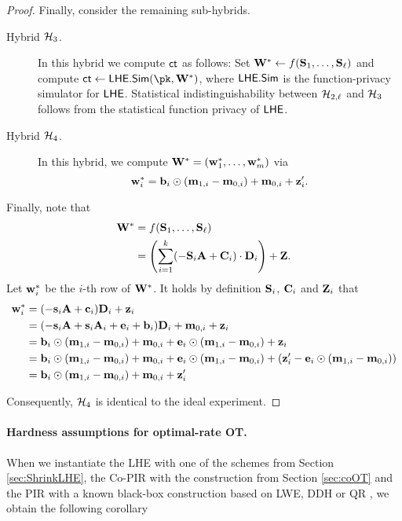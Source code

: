 \begin{proof}
Finally, consider the remaining sub-hybrids.

\begin{description}
\item[Hybrid $\mathcal{H}_3$.] In this hybrid we compute $\mathsf{ct}$ as follows: Set $\mathbf{W}^\ast \gets f(\mathbf{S}_1,\dots,\mathbf{S}_\ell)$ and compute $\ct \gets \LHE.\Sim(\pk,\vc{W}^\ast)$, where $\mathsf{LHE}.\mathsf{Sim}$ is the function-privacy simulator for $\mathsf{LHE}$. Statistical indistinguishability between $\mathcal{H}_{2,\ell}$ and $\mathcal{H}_3$ follows from the statistical function privacy of $\mathsf{LHE}$.

\item[Hybrid $\mathcal{H}_4$.] In this hybrid, we compute $\mathbf{W}^\ast=(\mathbf{w}^\ast_1,\dots, \mathbf{w}^\ast_m)$ via $$\mathbf{w}^\ast_i=\mathbf{b}_i\odot (\mathbf{m}_{1,i}-\mathbf{m}_{0,i})+\mathbf{m}_{0,i}+\mathbf{z}_i'.$$
\end{description}

Finally, note that
\begin{align*}
\mathbf{W}^\ast &= f(\mathbf{S}_1,\dots,\mathbf{S}_\ell)\\
&= \left( \sum_{i = 1}^k (-\mathbf{S}_i\mathbf{A} + \mathbf{C}_i)\cdot \mathbf{D}_i \right) + \mathbf{Z}.
\end{align*}
Let $\mathbf{w}^\ast_i$ be the $i$-th row of $\mathbf{W}^\ast$. It holds by definition $\mathbf{S}_i$, $\mathbf{C}_i$ and $\mathbf{Z}_i$ that
\begin{align*}
\mathbf{w}^\ast_i &= (-\mathbf{s}_i\mathbf{A} + \mathbf{c}_i)\mathbf{D}_i + \mathbf{z}_i\\
&= (-\mathbf{s}_i\mathbf{A} + \mathbf{s}_i\mathbf{A}_i +\mathbf{e}_i + \mathbf{b}_i)\mathbf{D}_i + \mathbf{m}_{0,i} + \mathbf{z}_i\\
&= \mathbf{b}_i \odot (\mathbf{m}_{1,i} - \mathbf{m}_{0,i}) + \mathbf{m}_{0,i} + \mathbf{e}_i \odot (\mathbf{m}_{1,i} - \mathbf{m}_{0,i}) + \mathbf{z}_i\\
&= \mathbf{b}_i \odot (\mathbf{m}_{1,i} - \mathbf{m}_{0,i}) + \mathbf{m}_{0,i} + \mathbf{e}_i \odot (\mathbf{m}_{1,i} - \mathbf{m}_{0,i}) + (\mathbf{z}_i'-\mathbf{e}_i\odot(\mathbf{m}_{1,i}-\mathbf{m}_{0,i}))\\
&= \mathbf{b}_i \odot (\mathbf{m}_{1,i} - \mathbf{m}_{0,i}) + \mathbf{m}_{0,i} + \mathbf{z}_i'\\
\end{align*}

Consequently, $\mathcal{H}_4$ is identical to the ideal experiment.
\end{proof}


\paragraph{Hardness assumptions for optimal-rate OT.} When we instantiate the LHE with one of the schemes from Section \ref{sec:ShrinkLHE}, the Co-PIR with the construction from Section \ref{sec:coOT} and the PIR with a known black-box construction based on LWE, DDH or QR \cite{C:DGIMMO19}, we obtain the following corollary

